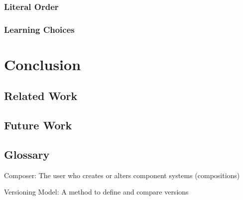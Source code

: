 \documentclass{report}
\begin{document}
\subsection{Literal Order}
\subsection{Learning Choices}




\chapter{Conclusion}
\section{Related Work}
\section{Future Work}

\section{Glossary}
Composer: The user who creates or alters component systems (compositions)

Versioning Model: A method to define and compare versions
\end{document}
